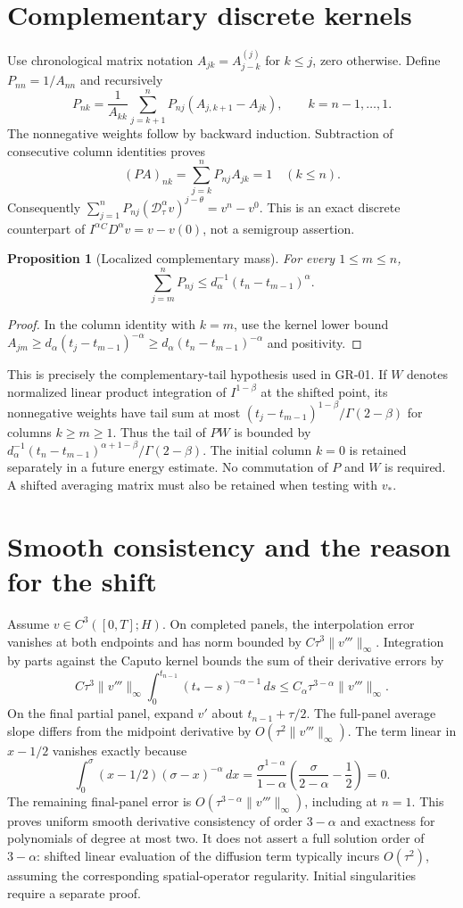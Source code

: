 \documentclass[11pt,a4paper]{article}
\newtheorem{proposition}{Proposition}
\newcommand{\norm}[1]{\lVert#1\rVert}
\newcommand{\D}{\mathcal D_\tau^\alpha}
\begin{document}
\section{Complementary discrete kernels}
Use chronological matrix notation $A_{jk}=A_{j-k}^{(j)}$ for $k\le j$, zero otherwise. Define $P_{nn}=1/A_{nn}$ and recursively
\[
 P_{nk}=\frac1{A_{kk}}\sum_{j=k+1}^nP_{nj}(A_{j,k+1}-A_{jk}),\qquad k=n-1,\ldots,1.
\]
The nonnegative weights follow by backward induction. Subtraction of consecutive column identities proves
\[
 (PA)_{nk}=\sum_{j=k}^nP_{nj}A_{jk}=1\quad(k\le n).
\]
Consequently $\sum_{j=1}^nP_{nj}(\D v)^{j-\theta}=v^n-v^0$. This is an exact discrete counterpart of $I^\alpha {}^CD^\alpha v=v-v(0)$, not a semigroup assertion.
\begin{proposition}[Localized complementary mass]
For every $1\le m\le n$,
\[
 \sum_{j=m}^nP_{nj}\le d_\alpha^{-1}(t_n-t_{m-1})^\alpha.
\]
\end{proposition}
\begin{proof}
In the column identity with $k=m$, use the kernel lower bound $A_{jm}\ge d_\alpha(t_j-t_{m-1})^{-\alpha}\ge d_\alpha(t_n-t_{m-1})^{-\alpha}$ and positivity.
\end{proof}
This is precisely the complementary-tail hypothesis used in GR-01. If $W$ denotes normalized linear product integration of $I^{1-\beta}$ at the shifted point, its nonnegative weights have tail sum at most $(t_j-t_{m-1})^{1-\beta}/\Gamma(2-\beta)$ for columns $k\ge m\ge1$. Thus the tail of $PW$ is bounded by $d_\alpha^{-1}(t_n-t_{m-1})^{\alpha+1-\beta}/\Gamma(2-\beta)$. The initial column $k=0$ is retained separately in a future energy estimate. No commutation of $P$ and $W$ is required. A shifted averaging matrix must also be retained when testing with $v_*$.
\section{Smooth consistency and the reason for the shift}
Assume $v\in C^3([0,T];H)$. On completed panels, the interpolation error vanishes at both endpoints and has norm bounded by $C\tau^3\norm{v'''}_\infty$. Integration by parts against the Caputo kernel bounds the sum of their derivative errors by
\[
 C\tau^3\norm{v'''}_\infty\int_0^{t_{n-1}}(t_*-s)^{-\alpha-1}\,ds
 \le C_\alpha\tau^{3-\alpha}\norm{v'''}_\infty.
\]
On the final partial panel, expand $v'$ about $t_{n-1}+\tau/2$. The full-panel average slope differs from the midpoint derivative by $O(\tau^2\norm{v'''}_\infty)$. The term linear in $x-1/2$ vanishes exactly because
\[
 \int_0^\sigma (x-1/2)(\sigma-x)^{-\alpha}\,dx
 =\frac{\sigma^{1-\alpha}}{1-\alpha}\left(\frac\sigma{2-\alpha}-\frac12\right)=0.
\]
The remaining final-panel error is $O(\tau^{3-\alpha}\norm{v'''}_\infty)$, including at $n=1$. This proves uniform smooth derivative consistency of order $3-\alpha$ and exactness for polynomials of degree at most two. It does not assert a full solution order of $3-\alpha$: shifted linear evaluation of the diffusion term typically incurs $O(\tau^2)$, assuming the corresponding spatial-operator regularity. Initial singularities require a separate proof.
\end{document}
